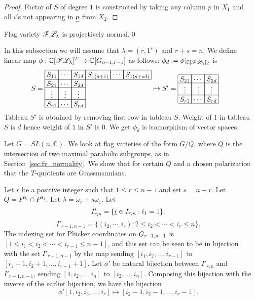 {\begin{proof}
    Factor of \(S\) of degree \(1\) is constructed by taking any column \(p\) in \(X_1\) 
    and all \(i'\)s not appearing in \(\underline{p}\) from \(X_2\).
\end{proof}
\begin{corollary}
    Flag variety \(\mathscr{F}\mathscr{L}_{\lambda}\) is projectively normal.\qed
\end{corollary}
In this subsection we will assume that \(\lambda = (r,1^s)\) and \(r+s=n\). 
We define linear map \(\phi:\mathbb{C}[\mathscr{F}\mathscr{L}_{\lambda}]^T \to \mathbb{C}[G_{{n-1},{r-1}}]\) as follows: \(\phi_d := \phi|_{\mathbb{C}[\mathscr{F}\mathscr{L}_{\lambda}]_d}\) is
\begin{align*}
    S=
    \begin{array}[c]{*{6}c}\cline{1-6}
        \lr{S_{11}}&\lr{\cdots}&\lr{S_{1d}}&\lr{S_{1(d+1)}}&\lr{\cdots}&\lr{S_{1(d+sd)}}\\\cline{1-6}
        \lr{S_{21}}&\lr{\cdots}&\lr{S_{2d}}\\\cline{1-3}
        \lr{\vdots}&\lr{\vdots}&\lr{\vdots}\\\cline{1-3}
        \lr{S_{r1}}&\lr{\cdots}&\lr{S_{rd}}\\\cline{1-3}
    \end{array}
    &\mapsto S'=
    \begin{array}[c]{*{3}c}\cline{1-3}
        \lr{S_{21}}&\lr{\cdots}&\lr{S_{2d}}\\\cline{1-3}
        \lr{\vdots}&\lr{\vdots}&\lr{\vdots}\\\cline{1-3}
        \lr{S_{r1}}&\lr{\cdots}&\lr{S_{rd}}\\\cline{1-3}
    \end{array}
\end{align*}
Tableau \(S'\) is obtained by removing first row in tableau \(S\). Weight of \(1\) in tableau \(S\) is \(d\) hence weight of \(1\) in \(S'\) is \(0\). We get \(\phi_d\) is isomorphism of vector spaces. 
}
Let $G=SL(n,{\mathbb C})$. We look at flag varieties of the form $G/Q$, where $Q$ is the intersection of two maximal parabolic subgroups, as in Section~\ref{sec:fv_normality}. 
We show that for certain $Q$ and a chosen polarization that the $T$-quotients are Grassmannians.
 
Let $r$ be a positive integer such that $1 \leq r \leq n-1$ and set $s = n-r$.  Let  $Q = P^{\alpha_r} \cap P^{\alpha_1}$. Let $\lambda = \omega_r + s\omega_1$.
Let \[I'_{r,n} = \{{\underline i} \in I_{r,n} : i_1 = 1\}.\]
\[I'_{r-1,n-1} = \{(i_2,\cdots,i_r):2 \le i_2 < \cdots < i_r \le n\}.\]
The indexing set for  Pl\"{u}cker coordinates on \(G_{{r-1},{n-1}}\) is $[1 \leq i_1 < i_2 < \cdots < i_{r-1} \leq n-1]$, and this set can be seen to be in bijection with the set $I'_{r-1,n-1}$ by the map sending 
$[i_1,i_2,\ldots,i_{r-1}]$ to $[i_1 + 1, i_2 + 1,\ldots, i_{r-1}+1]$.  Let \(\phi'\) be natural bijection between \(I'_{r,n}\) and \(I'_{r-1,n-1}\), sending $[1, i_2,\ldots,i_n]$ to $[i_2,\ldots,i_n]$.
Composing this bijection with the inverse of the earlier bijection, we have the bijection
$$\phi'[1, i_2,i_3,\ldots, i_r] \mapsto [i_2-1,i_3-1,\ldots,i_r - 1].$$


